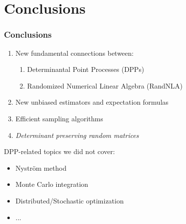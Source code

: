 \documentclass{beamer}
\begin{document}

\section{Conclusions}

\begin{frame}
  \frametitle{Conclusions}

  \begin{enumerate}
  \item New fundamental connections between:
    \begin{enumerate}
      \item Determinantal Point Processes (DPPs)
      \item Randomized Numerical Linear Algebra (RandNLA)
      \end{enumerate}\pause\vspace{2mm}
    \item New unbiased estimators and expectation
      formulas\vspace{2mm}\pause
      \item Efficient sampling algorithms\vspace{2mm}\pause
    \item \textit{Determinant preserving random matrices}
    \end{enumerate}
    \pause
    \vspace{2mm}
    {\footnotesize
DPP-related topics we did not cover:\vspace{-2mm}
    \begin{itemize}
    \item Nystr\"om method\vspace{-3mm}
    \item Monte Carlo integration\vspace{-3mm}
    \item Distributed/Stochastic optimization\vspace{-3mm}
    \item ...
    \end{itemize}}
  \pause
\begin{center}\end{center}
\end{frame}
\end{document}
